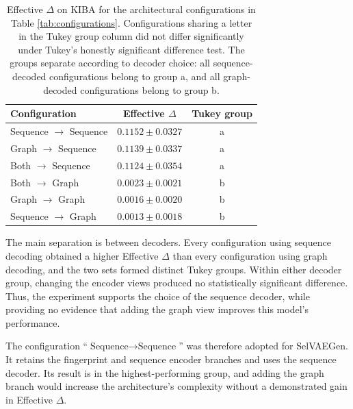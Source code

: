 \documentclass[a4paper,12pt]{article}
\begin{document}
\begin{table}[H]
    \centering
    \caption[Effective $\Delta$ by encoder and decoder branch.]{Effective $\Delta$ on KIBA for the architectural configurations in Table \ref{tab:configurations}. Configurations sharing a letter in the Tukey group column did not differ significantly under Tukey's honestly significant difference test. The groups separate according to decoder choice: all sequence-decoded configurations belong to group a, and all graph-decoded configurations belong to group b.}
    \label{tab:e2_branches}
    \begin{tabular}{lcc}
        \toprule
        \textbf{Configuration} & \textbf{Effective $\Delta$} & \textbf{Tukey group} \\
        \midrule
        Sequence $\rightarrow$ Sequence & $0.1152 \pm 0.0327$ & a \\
        Graph $\rightarrow$ Sequence & $0.1139 \pm 0.0337$ & a \\
        Both $\rightarrow$ Sequence & $0.1124 \pm 0.0354$ & a \\
        Both $\rightarrow$ Graph & $0.0023 \pm 0.0021$ & b \\
        Graph $\rightarrow$ Graph & $0.0016 \pm 0.0020$ & b \\
        Sequence $\rightarrow$ Graph & $0.0013 \pm 0.0018$ & b \\
        \bottomrule
    \end{tabular}
\end{table}

The main separation is between decoders. Every configuration using sequence decoding obtained a higher Effective $\Delta$ than every configuration using graph decoding, and the two sets formed distinct Tukey groups. Within either decoder group, changing the encoder views produced no statistically significant difference. Thus, the experiment supports the choice of the sequence decoder, while providing no evidence that adding the graph view improves this model's performance.

The configuration ``$\text{Sequence} \rightarrow \text{Sequence}$'' was therefore adopted for SelVAEGen. It retains the fingerprint and sequence encoder branches and uses the sequence decoder. Its result is in the highest-performing group, and adding the graph branch would increase the architecture's complexity without a demonstrated gain in Effective $\Delta$.

\newpage
\clearpage
{
    \printbibliography[heading=secbib, title={References}]
}
\end{document}
